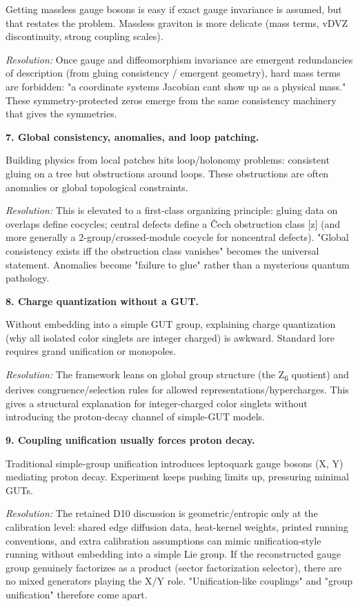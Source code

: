 Getting massless gauge bosons is easy if exact gauge invariance is assumed, but that restates the problem. Massless graviton is more delicate (mass terms, vDVZ discontinuity, strong coupling scales).

\emph{Resolution:} Once gauge and diffeomorphism invariance are emergent redundancies of description (from gluing consistency / emergent geometry), hard mass terms are forbidden: "a coordinate system\textquotesingle s Jacobian can\textquotesingle t show up as a physical mass." These symmetry-protected zeros emerge from the same consistency machinery that gives the symmetries.

\textbf{7. Global consistency, anomalies, and loop patching.}

Building physics from local patches hits loop/holonomy problems: consistent gluing on a tree but obstructions around loops. These obstructions are often anomalies or global topological constraints.

\emph{Resolution:} This is elevated to a first-class organizing principle: gluing data on overlaps define cocycles; central defects define a \v{C}ech obstruction class {[}z{]} (and more generally a 2-group/crossed-module cocycle for noncentral defects). "Global consistency exists iff the obstruction class vanishes" becomes the universal statement. Anomalies become "failure to glue" rather than a mysterious quantum pathology.

\textbf{8. Charge quantization without a GUT.}

Without embedding into a simple GUT group, explaining charge quantization (why all isolated color singlets are integer charged) is awkward. Standard lore requires grand unification or monopoles.

\emph{Resolution:} The framework leans on global group structure (the Z\textsubscript{6} quotient) and derives congruence/selection rules for allowed representations/hypercharges. This gives a structural explanation for integer-charged color singlets without introducing the proton-decay channel of simple-GUT models.

\textbf{9. Coupling unification usually forces proton decay.}

Traditional simple-group unification introduces leptoquark gauge bosons (X, Y) mediating proton decay. Experiment keeps pushing limits up, pressuring minimal GUTs.

\emph{Resolution:} The retained D10 discussion is geometric/entropic only at the calibration level: shared edge diffusion data, heat-kernel weights, printed running conventions, and extra calibration assumptions can mimic unification-style running without embedding into a simple Lie group. If the reconstructed gauge group genuinely factorizes as a product (sector factorization selector), there are no mixed generators playing the X/Y role. "Unification-like couplings" and "group unification" therefore come apart.

